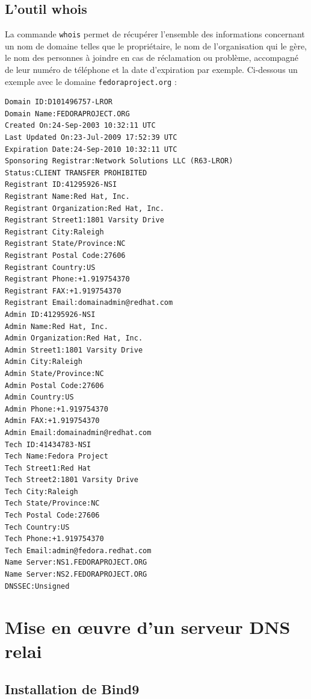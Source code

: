 \documentclass[12pt,a4paper,notitlepage]{article}
\begin{document}
\subsection{L'outil whois}
La commande \texttt{whois} permet de récupérer l'ensemble des informations concernant un nom de domaine telles que le propriétaire, le nom de l'organisation qui le gère, le nom des personnes à joindre en cas de réclamation ou problème, accompagné de leur numéro de téléphone et la date d'expiration par exemple.
Ci-dessous un exemple avec le domaine \texttt{fedoraproject.org} :\\
\begin{lstlisting}[title=Résultat de la commande whois]
Domain ID:D101496757-LROR
Domain Name:FEDORAPROJECT.ORG
Created On:24-Sep-2003 10:32:11 UTC
Last Updated On:23-Jul-2009 17:52:39 UTC
Expiration Date:24-Sep-2010 10:32:11 UTC
Sponsoring Registrar:Network Solutions LLC (R63-LROR)
Status:CLIENT TRANSFER PROHIBITED
Registrant ID:41295926-NSI
Registrant Name:Red Hat, Inc.
Registrant Organization:Red Hat, Inc.
Registrant Street1:1801 Varsity Drive
Registrant City:Raleigh
Registrant State/Province:NC
Registrant Postal Code:27606
Registrant Country:US
Registrant Phone:+1.919754370
Registrant FAX:+1.919754370
Registrant Email:domainadmin@redhat.com
Admin ID:41295926-NSI
Admin Name:Red Hat, Inc.
Admin Organization:Red Hat, Inc.
Admin Street1:1801 Varsity Drive
Admin City:Raleigh
Admin State/Province:NC
Admin Postal Code:27606
Admin Country:US
Admin Phone:+1.919754370
Admin FAX:+1.919754370
Admin Email:domainadmin@redhat.com
Tech ID:41434783-NSI
Tech Name:Fedora Project
Tech Street1:Red Hat
Tech Street2:1801 Varsity Drive
Tech City:Raleigh
Tech State/Province:NC
Tech Postal Code:27606
Tech Country:US
Tech Phone:+1.919754370
Tech Email:admin@fedora.redhat.com
Name Server:NS1.FEDORAPROJECT.ORG
Name Server:NS2.FEDORAPROJECT.ORG
DNSSEC:Unsigned
\end{lstlisting}

\clearpage
\section{Mise en \oe uvre d'un serveur DNS relai}
\subsection{Installation de Bind9}
\end{document}
